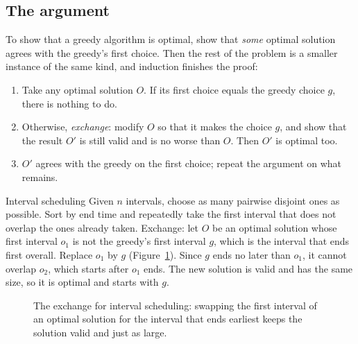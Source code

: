\subsection{The argument}

To show that a greedy algorithm is optimal, show that \emph{some} optimal solution agrees with the greedy's first choice.
Then the rest of the problem is a smaller instance of the same kind, and induction finishes the proof:

\begin{enumerate}
  \item Take any optimal solution $O$. If its first choice equals the greedy choice $g$, there is nothing to do.
  \item Otherwise, \emph{exchange}: modify $O$ so that it makes the choice $g$, and show that the result $O'$ is still valid
        and is no worse than $O$. Then $O'$ is optimal too.
  \item $O'$ agrees with the greedy on the first choice; repeat the argument on what remains.
\end{enumerate}

\begin{problem}{Interval scheduling}
Given $n$ intervals, choose as many pairwise disjoint ones as possible.
\solution Sort by end time and repeatedly take the first interval that does not overlap the ones already taken. Exchange:
let $O$ be an optimal solution whose first interval $o_1$ is not the greedy's first interval $g$, which is the interval that
ends first overall. Replace $o_1$ by $g$ (Figure~\ref{fig:exchange-intervals}). Since $g$ ends no later than $o_1$, it
cannot overlap $o_2$, which starts after $o_1$ ends. The new solution is valid and has the same size, so it is optimal and
starts with $g$.
\end{problem}

\begin{figure}[htbp]
\centering
{}
\caption{The exchange for interval scheduling: swapping the first interval of an optimal solution for the interval that ends
earliest keeps the solution valid and just as large.}
\label{fig:exchange-intervals}
\end{figure}

